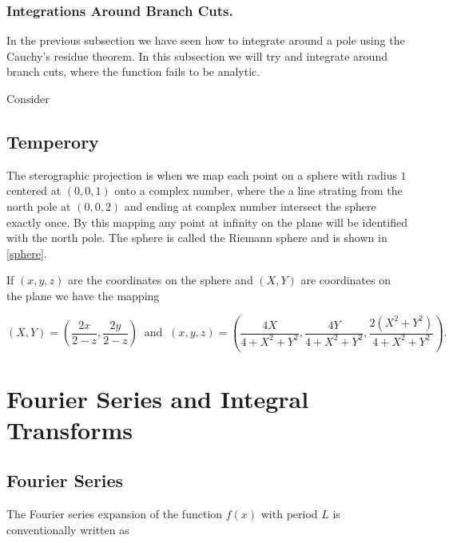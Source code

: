\documentclass[english,a4paper,12pt]{report}
\begin{document}
\subsection{Integrations Around Branch Cuts.}

In the previous subsection we have seen how to integrate around a pole using the Cauchy's residue theorem. In this subsection we will try and integrate around branch cuts, where the function fails to be analytic.

Consider 











\section{Temperory}

The sterographic projection is when we map each point on a sphere with radius \(1\) centered at \((0,0,1)\) onto a complex number, where the a line strating from the north pole at \((0,0,2)\) and ending at complex number intersect the sphere exactly once. By this mapping any point at infinity on the plane will be identified with the north pole. The sphere is called the Riemann sphere and is shown in \cref{sphere}.


If \((x,y,z)\) are the coordinates on the sphere and \((X,Y)\) are coordinates on the plane we have the mapping 

\begin{equation}
    (X,Y) = \left(\frac{2x}{2-z}, \frac{2y}{2-z}  \right) ~\text { and }~ (x,y,z) = \left( \frac{4X}{4+X^2+Y^2},\frac{4Y}{4+X^2+Y^2}, \frac{2(X^2+Y^2)}{4+X^2+Y^2}    \right).
\end{equation}




\chapter{Fourier Series and Integral Transforms}

\section{Fourier Series}

The Fourier series expansion of the function \(f(x)\) with period \(L\) is conventionally written as 
\end{document}
